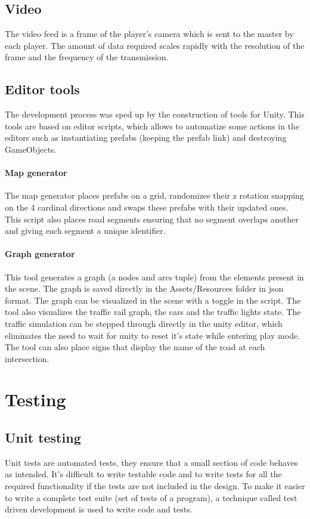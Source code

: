 \documentclass[12pt]{article}
\newcommand\blankpage{%
    \null
    \thispagestyle{empty}%
    \addtocounter{page}{-1}%
    \newpage}
\begin{document}
\subsection{Video}
The video feed is a frame of the player's camera which is sent to the master by each player. The amount of data required scales rapidly with the resolution of the frame and the frequency of the transmission.

\subsection{Editor tools}
The development process was sped up by the construction of tools for Unity. This tools are based on editor scripts, which allows to automatize some actions in the editors such as instantiating prefabs (keeping the prefab link) and destroying GameObjects.
\paragraph{Map generator}
The map generator places prefabs on a grid, randomizes their z rotation snapping on the 4 cardinal directions and swaps these prefabs with their updated ones. This script also places road segments ensuring that no segment overlaps another and giving each segment a unique identifier.
\paragraph{Graph generator}
This tool generates a graph (a nodes and arcs tuple) from the elements present in the scene. The graph is saved directly in the Assets/Resources folder in json format. The graph can be visualized in the scene with a toggle in the script. The tool also visualizes the traffic rail graph, the cars and the traffic lights state. The traffic simulation can be stepped through directly in the unity editor, which eliminates the need to wait for unity to reset it's state while entering play mode. The tool can also place signs that display the name of the road at each intersection.

\afterpage{\blankpage}

\clearpage

\section{Testing}
\subsection{Unit testing}
Unit tests are automated tests, they ensure that a small section of code behaves as intended. It's difficult to write testable code and to write tests for all the required functionality if the tests are not included in the design. To make it easier to write a complete test suite (set of tests of a program), a technique called test driven development is used to write code and tests.
\end{document}
